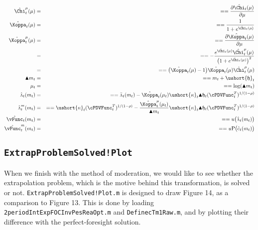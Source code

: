 \documentclass[titlepage,abstract]{\econtex}
\providecommand{\vInv}{\ensuremath{\scriptstyle \Lambda \displaystyle}}
\begin{document}
\begin{itemize}
            \begin{equation}\begin{gathered}\begin{aligned}
            \hat{\Chi}^{\mu}_{t}(\mu)   &=& =  =  \frac{\partial \hat{\Chi}_{t}(\mu)}{\partial \mu} \\
            \hat{\Koppa}_{t} (\mu)   &=& =  =  \frac{1}{1+e^{\hat{\Chi}_{t}(\mu)}} \\
            \hat{\Koppa}^{\mu}_{t} (\mu)   &=& =  =  \frac{\partial \hat{\Koppa}_{t} (\mu)}{\partial \mu} \\
              &=& =  =  -\frac{e^{\hat{\Chi}_{t}(\mu)} \hat{\Chi}^{\mu}_{t}(\mu)}{\big(1+e^{\hat{\Chi}_{t}(\mu)}\big)^{2}} \\
              &=& =  =  \big(\hat{\Koppa}_{t} (\mu)-1\big)\hat{\Koppa}_{t} (\mu) \hat{\Chi}^{\mu}_{t}(\mu) \\
            \blacktriangle m_{t}   &=& =  =  m_{t} + \ushort{\mathfrak{h}}_{t} \\
            \mu_{t}   &=& =  =  \log(\blacktriangle m_{t}) \\
            \hat{\vInv}_{t} (m_{t})   &=& =  =  \bar{\vInv}_{t}(m_{t})-\hat{\Koppa}_{t} (\mu_{t}) \ushort{\kappa}_{t} \blacktriangle \mathfrak{h}_{t} (\cPDVFunc_{t}^{T})^{1/(1-\rho)} \\
            \hat{\vInv}_{t}^{m} (m_{t})   &=& =  =  \ushort{\kappa}_{t} (\cPDVFunc_{t}^{T})^{1/(1-\rho)}-\frac{\hat{\Koppa}_{t}^{\mu}(\mu_{t})}{\blacktriangle m_{t}} \ushort{\kappa}_{t} \blacktriangle \mathfrak{h}_{t} (\cPDVFunc_{t}^{T})^{1/(1-\rho)} \\
            \hat{\vFunc}_{t} (m_{t})   &=& =  =  u\big(\hat{\vInv}_{t}(m_{t})\big) \\
            \hat{\vFunc}_{t}^{m} (m_{t})   &=& =  =  u\text{P}\big(\hat{c}_{t}(m_{t})\big)
            \end{aligned}\end{gathered}\end{equation}
\end{itemize}

\subsection{\texttt{ExtrapProblemSolved!Plot}}

When we finish with the method of moderation, we would like to see whether the extrapolation problem, which is the motive behind this transformation, is solved or not. \texttt{ExtrapProblemSolved!Plot.m} is designed to draw Figure 14, as a comparison to Figure 13. This is done by loading \texttt{2periodIntExpFOCInvPesReaOpt.m} and \texttt{DefinecTm1Raw.m}, and by plotting their difference with the perfect-foresight solution.
\end{document}
